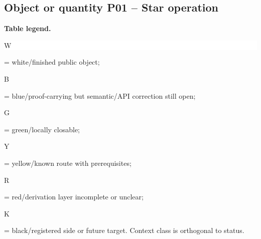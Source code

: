 \subsection*{Object or quantity P01 -- Star operation}
\hypertarget{objproof:P01}{}
\par\smallskip\noindent\begin{minipage}{0.99\linewidth}\footnotesize\raggedright\textbf{Table legend.} \colorbox{white}{\strut W} = white/finished public object; \colorbox{cyan!20}{\strut B} = blue/proof-carrying but semantic/API correction still open; \colorbox{green!18}{\strut G} = green/locally closable; \colorbox{yellow!25}{\strut Y} = yellow/known route with prerequisites; \colorbox{red!20}{\strut R} = red/derivation layer incomplete or unclear; \colorbox{black!18}{\strut K} = black/registered side or future target. Context class is orthogonal to status.\end{minipage}\par\vspace{0.25em}

